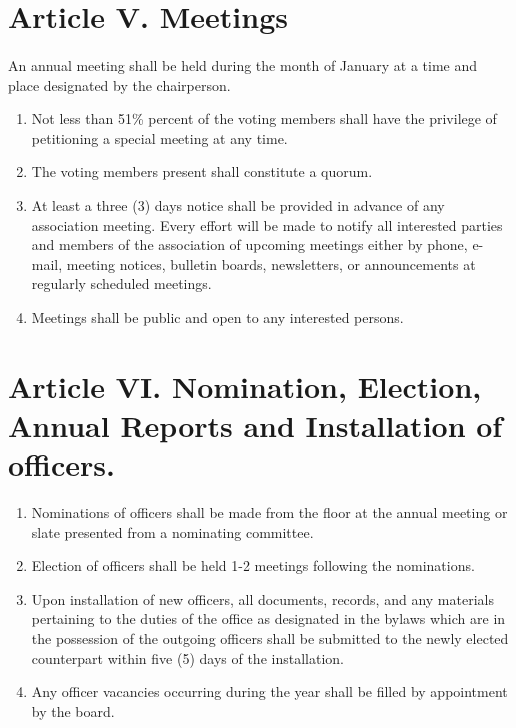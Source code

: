 \documentclass[letterpaper,10pt]{article}
\begin{document}
\section*{Article V. Meetings}
\paragraph{}An annual meeting shall be held during the month of January at a time and place designated by the chairperson.
\begin{enumerate}[label=(\Alph*)]
\item Not less than 51\% percent of the voting members shall have the privilege of petitioning a special meeting at any time.
\item The voting members present shall constitute a quorum.
\item At least a three (3) days notice shall be provided in advance of any association meeting. Every effort will be made to notify all interested parties and members of the association of upcoming meetings either by phone, e-mail, meeting notices, bulletin boards, newsletters, or announcements at regularly scheduled meetings.
\item Meetings shall be public and open to any interested persons.
\end{enumerate}

\section*{Article VI. Nomination, Election, Annual Reports and Installation of officers.}
\begin{enumerate}[label=(\Alph*)]
\item Nominations of officers shall be made from the floor at the annual meeting or slate presented from a nominating committee.
\item Election of officers shall be held 1-2 meetings following the nominations.
\item Upon installation of new officers, all documents, records, and any materials pertaining to the duties of the office as designated in the bylaws which are in the possession of the outgoing officers shall be submitted to the newly elected counterpart within five (5) days of the installation.
\item Any officer vacancies occurring during the year shall be filled by appointment by the board.
\end{enumerate}
\end{document}
